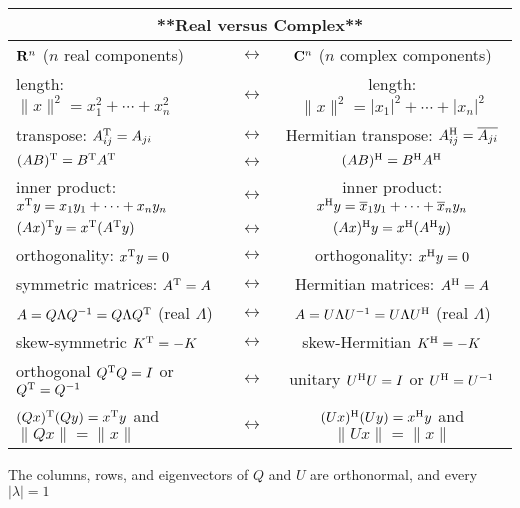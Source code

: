 \begin{tabular}{l c c} \multicolumn{3}{c}{**Real versus Complex**} \\ \hline \({\bf R}^{n}\) (\(n\) real components) & \(\leftrightarrow\) & \({\bf C}^{n}\) (\(n\) complex components) \\ length: \(\|x\|^{2}=x_{1}^{2}+\cdots+x_{n}^{2}\) & \(\leftrightarrow\) & length: \(\|x\|^{2}=|x_{1}|^{2}+\cdots+|x_{n}|^{2}\) \\ transpose: \(A_{ij}^{\rm T}=A_{ji}\) & \(\leftrightarrow\) & Hermitian transpose: \(A_{ij}^{\rm H}=\overline{A_{ji}}\) \\ \((AB)^{\rm T}=B^{\rm T}A^{\rm T}\) & \(\leftrightarrow\) & \((AB)^{\rm H}=B^{\rm H}A^{\rm H}\) \\ inner product: \(x^{\rm T}y=x_{1}y_{1}+\cdots+x_{n}y_{n}\) & \(\leftrightarrow\) & inner product: \(x^{\rm H}y=\overline{x}_{1}y_{1}+\cdots+\overline{x}_{n}y_{n}\) \\ \((Ax)^{\rm T}y=x^{\rm T}(A^{\rm T}y)\) & \(\leftrightarrow\) & \((Ax)^{\rm H}y=x^{\rm H}(A^{\rm H}y)\) \\ orthogonality: \(x^{\rm T}y=0\) & \(\leftrightarrow\) & orthogonality: \(x^{\rm H}y=0\) \\ symmetric matrices: \(A^{\rm T}=A\) & \(\leftrightarrow\) & Hermitian matrices: \(A^{\rm H}=A\) \\ \(A=Q\Lambda Q^{-1}=Q\Lambda Q^{\rm T}\) (real \(\Lambda\)) & \(\leftrightarrow\) & \(A=U\Lambda U^{-1}=U\Lambda U^{\rm H}\) (real \(\Lambda\)) \\ skew-symmetric \(K^{\rm T}=-K\) & \(\leftrightarrow\) & skew-Hermitian \(K^{\rm H}=-K\) \\ orthogonal \(Q^{\rm T}Q=I\) or \(Q^{\rm T}=Q^{-1}\) & \(\leftrightarrow\) & unitary \(U^{\rm H}U=I\) or \(U^{\rm H}=U^{-1}\) \\ \((Qx)^{\rm T}(Qy)=x^{\rm T}y\) and \(\|Qx\|=\|x\|\) & \(\leftrightarrow\) & \((Ux)^{\rm H}(Uy)=x^{\rm H}y\) and \(\|Ux\|=\|x\|\) \\ \hline \end{tabular} The columns, rows, and eigenvectors of \(Q\) and \(U\) are orthonormal, and every \(|\lambda|=1\)